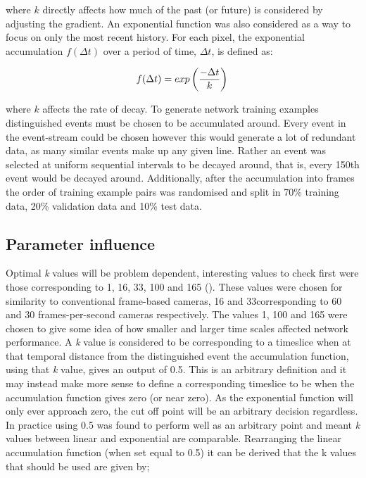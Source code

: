 where $k$ directly affects how much of the past (or future) is considered by adjusting the gradient.
An exponential function was also considered as a way to focus on only the most recent history.
For each pixel, the exponential accumulation $f(\Delta t)$ over a period of time, $\Delta t$, is defined as:

\begin{equation}
 \label{eq:expDecay}
    f(\Delta t) = exp\left(\frac{-\Delta t}{k}\right) \\
\end{equation}

where $k$ affects the rate of decay. 
To generate network training examples distinguished events must be chosen to be accumulated around.
Every event in the event-stream could be chosen however this would generate a lot of redundant data, as many similar events make up any given line.
Rather an event was selected at uniform sequential intervals to be decayed around, that is, every 150th event would be decayed around. 
Additionally, after the accumulation into frames the order of training example pairs was randomised and split in 70\% training data, 20\% validation data and 10\% test data. 


\subsection{Parameter influence}
Optimal \textit{k} values will be problem dependent, interesting values to check first were those corresponding to 1, 16, 33, 100 and 165 (\ms). 
These values were chosen for similarity to conventional frame-based cameras, 16 and 33\ms corresponding to 60 and 30 frames-per-second cameras respectively. 
The values 1, 100 and 165 \ms were chosen to give some idea of how smaller and larger time scales affected network performance. 
A \textit{k} value is considered to be corresponding to a timeslice when at that temporal distance from the distinguished event the accumulation function, using that \textit{k} value, gives an output of 0.5.
This is an arbitrary definition and it may instead make more sense to define a corresponding timeslice to be when the accumulation function gives zero (or near zero). 
As the exponential function will only ever approach zero, the cut off point will be an arbitrary decision regardless.
In practice using 0.5 was found to perform well as an arbitrary point and meant \textit{k} values between linear and exponential are comparable.
Rearranging the linear accumulation function (when set equal to 0.5) it can be derived that the k values that should be used are given by;

